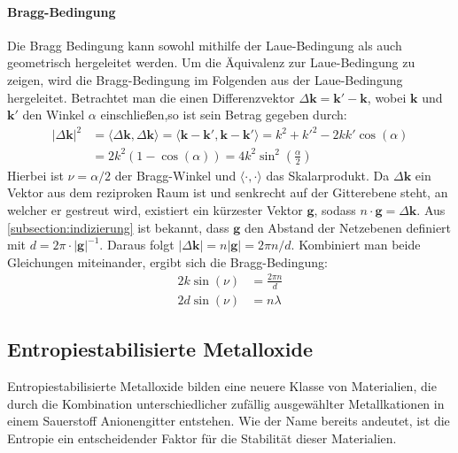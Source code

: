 \paragraph{Bragg-Bedingung}
Die Bragg Bedingung kann sowohl mithilfe der Laue-Bedingung als auch geometrisch hergeleitet werden.
Um die Äquivalenz zur Laue-Bedingung zu zeigen, wird die Bragg-Bedingung im Folgenden aus der Laue-Bedingung
hergeleitet.
Betrachtet man die einen Differenzvektor $\Delta \mathbf{k}=\mathbf{k}'-\mathbf{k}$, wobei $\mathbf{k}$ und
$\mathbf{k'}$ den Winkel $\alpha$ einschließen,so ist sein Betrag gegeben durch:
\begin{align}
    \lvert \Delta \mathbf{k} \rvert ^{2}&=\langle \Delta \mathbf{k} ,\Delta \mathbf{k}\rangle =\langle \mathbf{k}-\mathbf{k}', \mathbf{k}-\mathbf{k}' \rangle = k^{2}+k'^{2}-2kk'\cos(\alpha)  \\
    &=2{k}^{2}(1-\cos(\alpha))=4k^{2}\sin ^{2}\left( \frac{\alpha}{2} \right)
\end{align}
Hierbei ist $\nu = \alpha / 2$ der Bragg-Winkel und $\langle \cdot , \cdot \rangle$ das Skalarprodukt.
Da $\Delta \mathbf{k}$ ein Vektor aus dem reziproken Raum ist und senkrecht auf der Gitterebene
steht, an welcher er gestreut wird, existiert ein kürzester Vektor $\mathbf{g}$, sodass
$n\cdot \mathbf{g} =\Delta \mathbf{k}$.
Aus \cref{subsection:indizierung} ist bekannt, dass $\mathbf{g}$ den Abstand der Netzebenen definiert
mit $d = 2 \pi \cdot\lvert \mathbf{g} \rvert ^{-1}$.
Daraus folgt $\lvert \Delta \mathbf{k} \rvert=n \lvert \mathbf{g} \rvert = 2\pi n/d$.
Kombiniert man beide Gleichungen miteinander, ergibt sich die Bragg-Bedingung:\autocite[125-126]{Ashcroft}
\begin{align}
    2k\sin(\nu)&=\frac{2\pi n}{d} \\
    2d\sin(\nu)&=n \lambda
\end{align}

\subsection{Entropiestabilisierte Metalloxide}\label{subsec:hochentropische-metalloxide}
Entropiestabilisierte Metalloxide bilden eine neuere Klasse von Materialien, die durch die Kombination unterschiedlicher
zufällig ausgewählter Metallkationen in einem Sauerstoff Anionengitter entstehen.
Wie der Name bereits andeutet, ist die Entropie ein entscheidender Faktor für die Stabilität dieser Materialien.